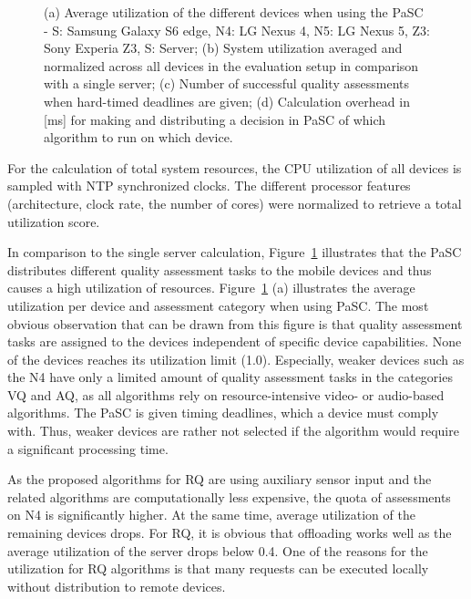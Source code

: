 \begin{figure}[!htb]
	\caption[Evaluation results for using the PaSC]{(a) Average utilization of the different devices when using the PaSC - S: Samsung Galaxy S6 edge, N4: LG Nexus 4, N5: LG Nexus 5, Z3: Sony Experia Z3, S: Server; (b) System utilization averaged and normalized across all devices in the evaluation setup in comparison with a single server; (c) Number of successful quality assessments when hard-timed deadlines are given; (d) Calculation overhead in [ms] for making and distributing a decision in PaSC of which algorithm to run on which device.}
	\label{fig:557_PaSC_Results}
\end{figure}
For the calculation of total system resources, the \ac{CPU} utilization of all devices is sampled with \ac{NTP} synchronized clocks. 
The different processor features (architecture, clock rate, the number of cores) were normalized to retrieve a total utilization score.

In comparison to the single server calculation, Figure~\ref{fig:557_PaSC_Results} illustrates that the \ac{PaSC} distributes different quality assessment tasks to the mobile devices and thus causes a high utilization of resources.
Figure~\ref{fig:557_PaSC_Results} (a) illustrates the average utilization per device and assessment category when using \ac{PaSC}.
The most obvious observation that can be drawn from this figure is that quality assessment tasks are assigned to the devices independent of specific device capabilities. None of the devices reaches its utilization limit (1.0). Especially, weaker devices such as the N4 have only a limited amount of quality assessment tasks in the categories \ac{VQ} and \ac{AQ}, as all algorithms rely on resource-intensive video- or audio-based algorithms.
The \ac{PaSC} is given timing deadlines, which a device must comply with. 
Thus, weaker devices are rather not selected if the algorithm would require a significant processing time.

As the proposed algorithms for \ac{RQ} are using auxiliary sensor input and the related algorithms are computationally less expensive, the quota of assessments on N4 is significantly higher.
At the same time, average utilization of the remaining devices drops.
For \ac{RQ}, it is obvious that offloading works well as the average utilization of the server drops below 0.4.
One of the reasons for the utilization for \ac{RQ} algorithms is that many requests can be executed locally without distribution to remote devices.

